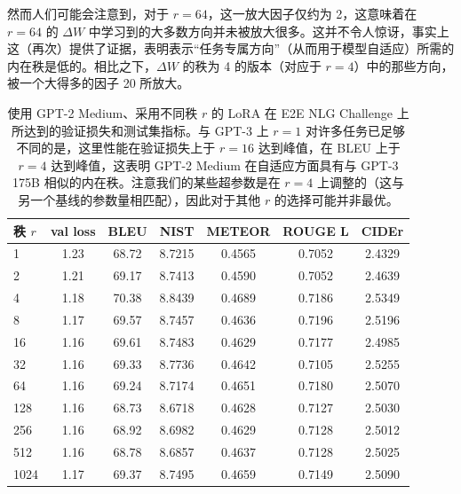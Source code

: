 \documentclass[11pt,UTF8,fontset=fandol]{ctexart}
\begin{document}
然而人们可能会注意到，对于 $r=64$，这一放大因子仅约为 2，这意味着在 $r=64$ 的 $\Delta W$ 中学习到的大多数方向并未被放大很多。这并不令人惊讶，事实上这（再次）提供了证据，表明表示“任务专属方向”（从而用于模型自适应）所需的内在秩是低的。相比之下，$\Delta W$ 的秩为 4 的版本（对应于 $r=4$）中的那些方向，被一个大得多的因子 20 所放大。

\begin{table}[H]\centering
\caption{使用 GPT-2 Medium、采用不同秩 $r$ 的 LoRA 在 E2E NLG Challenge 上所达到的验证损失和测试集指标。与 GPT-3 上 $r=1$ 对许多任务已足够不同的是，这里性能在验证损失上于 $r=16$ 达到峰值，在 BLEU 上于 $r=4$ 达到峰值，这表明 GPT-2 Medium 在自适应方面具有与 GPT-3 175B 相似的内在秩。注意我们的某些超参数是在 $r=4$ 上调整的（这与另一个基线的参数量相匹配），因此对于其他 $r$ 的选择可能并非最优。}
\label{tab:18}
\begin{tabular}{lcccccc}
\toprule
秩 $r$ & val loss & BLEU & NIST & METEOR & ROUGE L & CIDEr \\
\midrule
1 & 1.23 & 68.72 & 8.7215 & 0.4565 & 0.7052 & 2.4329 \\
2 & 1.21 & 69.17 & 8.7413 & 0.4590 & 0.7052 & 2.4639 \\
4 & 1.18 & 70.38 & 8.8439 & 0.4689 & 0.7186 & 2.5349 \\
8 & 1.17 & 69.57 & 8.7457 & 0.4636 & 0.7196 & 2.5196 \\
16 & 1.16 & 69.61 & 8.7483 & 0.4629 & 0.7177 & 2.4985 \\
32 & 1.16 & 69.33 & 8.7736 & 0.4642 & 0.7105 & 2.5255 \\
64 & 1.16 & 69.24 & 8.7174 & 0.4651 & 0.7180 & 2.5070 \\
128 & 1.16 & 68.73 & 8.6718 & 0.4628 & 0.7127 & 2.5030 \\
256 & 1.16 & 68.92 & 8.6982 & 0.4629 & 0.7128 & 2.5012 \\
512 & 1.16 & 68.78 & 8.6857 & 0.4637 & 0.7128 & 2.5025 \\
1024 & 1.17 & 69.37 & 8.7495 & 0.4659 & 0.7149 & 2.5090 \\
\bottomrule
\end{tabular}
\end{table}
\end{document}
